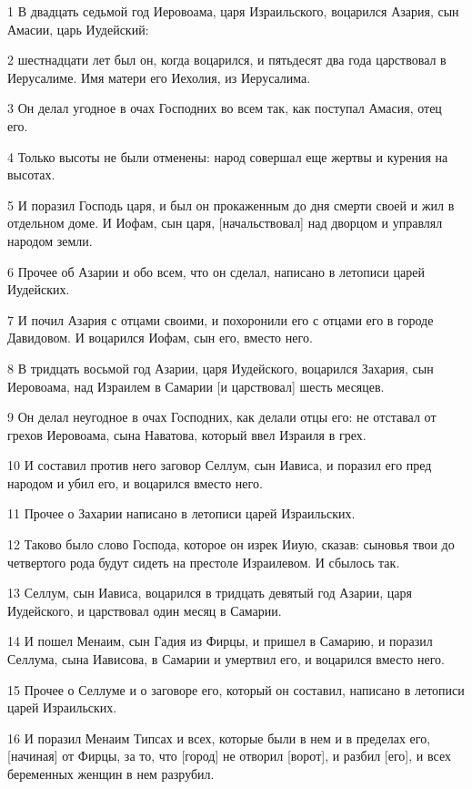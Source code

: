 \par 1 В двадцать седьмой год Иеровоама, царя Израильского, воцарился Азария, сын Амасии, царь Иудейский:
\par 2 шестнадцати лет был он, когда воцарился, и пятьдесят два года царствовал в Иерусалиме. Имя матери его Иехолия, из Иерусалима.
\par 3 Он делал угодное в очах Господних во всем так, как поступал Амасия, отец его.
\par 4 Только высоты не были отменены: народ совершал еще жертвы и курения на высотах.
\par 5 И поразил Господь царя, и был он прокаженным до дня смерти своей и жил в отдельном доме. И Иофам, сын царя, [начальствовал] над дворцом и управлял народом земли.
\par 6 Прочее об Азарии и обо всем, что он сделал, написано в летописи царей Иудейских.
\par 7 И почил Азария с отцами своими, и похоронили его с отцами его в городе Давидовом. И воцарился Иофам, сын его, вместо него.
\par 8 В тридцать восьмой год Азарии, царя Иудейского, воцарился Захария, сын Иеровоама, над Израилем в Самарии [и царствовал] шесть месяцев.
\par 9 Он делал неугодное в очах Господних, как делали отцы его: не отставал от грехов Иеровоама, сына Наватова, который ввел Израиля в грех.
\par 10 И составил против него заговор Селлум, сын Иависа, и поразил его пред народом и убил его, и воцарился вместо него.
\par 11 Прочее о Захарии написано в летописи царей Израильских.
\par 12 Таково было слово Господа, которое он изрек Ииую, сказав: сыновья твои до четвертого рода будут сидеть на престоле Израилевом. И сбылось так.
\par 13 Селлум, сын Иависа, воцарился в тридцать девятый год Азарии, царя Иудейского, и царствовал один месяц в Самарии.
\par 14 И пошел Менаим, сын Гадия из Фирцы, и пришел в Самарию, и поразил Селлума, сына Иависова, в Самарии и умертвил его, и воцарился вместо него.
\par 15 Прочее о Селлуме и о заговоре его, который он составил, написано в летописи царей Израильских.
\par 16 И поразил Менаим Типсах и всех, которые были в нем и в пределах его, [начиная] от Фирцы, за то, что [город] не отворил [ворот], и разбил [его], и всех беременных женщин в нем разрубил.
